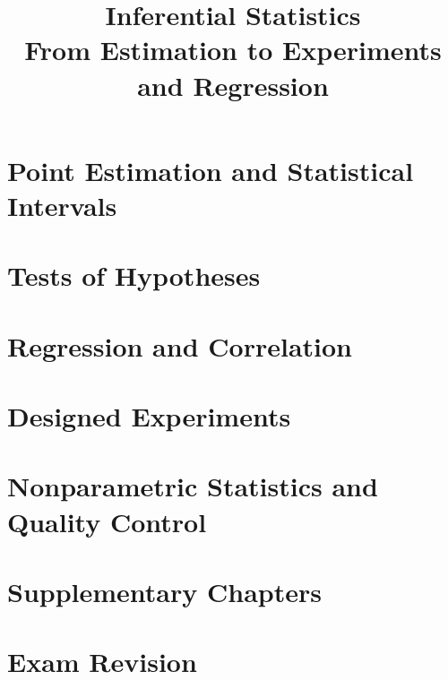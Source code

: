\documentclass[11pt,a4paper,oneside]{book}
\title{\Huge\bfseries Inferential Statistics\\[0.3em]\Large From Estimation to Experiments and Regression}
\author{}
\date{}
\theoremstyle{plain}
\theoremstyle{definition}
\theoremstyle{remark}
\begin{document}
\frontmatter
\maketitle
\tableofcontents
\mainmatter

\part{Point Estimation and Statistical Intervals}



\part{Tests of Hypotheses}



\part{Regression and Correlation}



\part{Designed Experiments}



\part{Nonparametric Statistics and Quality Control}



\part{Supplementary Chapters}





\part{Exam Revision}


\end{document}
